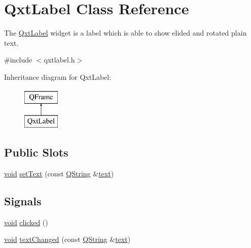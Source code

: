 \hypertarget{class_qxt_label}{\section{Qxt\-Label Class Reference}
\label{class_qxt_label}
}


The \hyperlink{class_qxt_label}{Qxt\-Label} widget is a label which is able to show elided and rotated plain text.  




{\ttfamily \#include $<$qxtlabel.\-h$>$}

Inheritance diagram for Qxt\-Label\-:\begin{figure}[H]
\begin{center}
\leavevmode
\includegraphics[height=2.000000cm]{class_qxt_label}
\end{center}
\end{figure}
\subsection*{Public Slots}
\begin{DoxyCompactItemize}
\item 
\hyperlink{group___u_a_v_objects_plugin_ga444cf2ff3f0ecbe028adce838d373f5c}{void} \hyperlink{class_qxt_label_a99165b510e6b49a2b586f72545ff146e}{set\-Text} (const \hyperlink{group___u_a_v_objects_plugin_gab9d252f49c333c94a72f97ce3105a32d}{Q\-String} \&\hyperlink{class_qxt_label_a62d0ce110fe3e51ea6ea82cd8e60d430}{text})
\end{DoxyCompactItemize}
\subsection*{Signals}
\begin{DoxyCompactItemize}
\item 
\hyperlink{group___u_a_v_objects_plugin_ga444cf2ff3f0ecbe028adce838d373f5c}{void} \hyperlink{class_qxt_label_afd3f9137d5f3287c32786395c485f203}{clicked} ()
\item 
\hyperlink{group___u_a_v_objects_plugin_ga444cf2ff3f0ecbe028adce838d373f5c}{void} \hyperlink{class_qxt_label_a58f69b8d43d1c6d920bdb0566491f4b2}{text\-Changed} (const \hyperlink{group___u_a_v_objects_plugin_gab9d252f49c333c94a72f97ce3105a32d}{Q\-String} \&\hyperlink{class_qxt_label_a62d0ce110fe3e51ea6ea82cd8e60d430}{text})
\end{DoxyCompactItemize}
